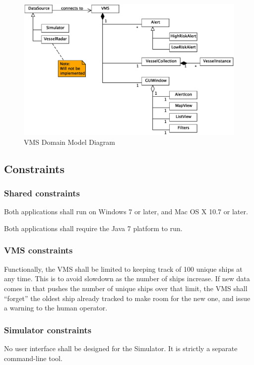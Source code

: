 \documentclass{article}
\begin{document}
\begin{figure}[h]
\caption{VMS Domain Model Diagram}
\includegraphics[width=\linewidth]{domain-model.eps}
\end{figure}

\subsection{Constraints} %

\subsubsection{Shared constraints}
Both applications shall run on Windows 7 or later, and Mac OS X 10.7 or later.

Both applications shall require the Java 7 platform to run.

\subsubsection{VMS constraints}
Functionally, the VMS shall be limited to keeping track of 100 unique ships at any time. This is to avoid slowdown as the number of ships increase. If new data comes in that pushes the number of unique ships over that limit, the VMS shall ``forget'' the oldest ship already tracked to make room for the new one, and issue a warning to the human operator.

\subsubsection{Simulator constraints}

No user interface shall be designed for the Simulator. It is strictly a separate command-line tool.
\end{document}
